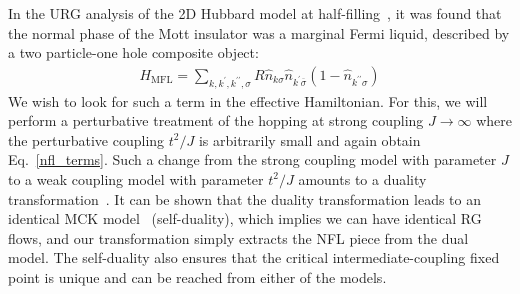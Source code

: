 \documentclass[reprint,prb,superscriptaddress]{revtex4-2}
\begin{document}
In the URG analysis of the 2D Hubbard model at half-filling~\cite{anirbanurg1}, it was found that the normal phase of the Mott insulator was a marginal Fermi liquid, described by a two particle-one hole composite object:
\begin{equation}\begin{aligned}
	\label{mfl_urg}
	H_\text{MFL} = \sum_{k,k^\prime,k^{\prime\prime},\sigma}R \hat n_{k\sigma} \hat n_{k^\prime \overline\sigma}\left(1 - \hat n_{k^{\prime\prime}\sigma}\right) 
\end{aligned}\end{equation}
We wish to look for such a term in the effective Hamiltonian. For this, we will perform a perturbative treatment of the hopping at strong coupling \(J \to \infty\) where the perturbative coupling \(t^2/J\) is arbitrarily small and again obtain Eq.~\ref{nfl_terms}. Such a change from the strong coupling model with parameter \(J\) to a weak coupling model with parameter \(t^2/J\) amounts to a duality transformation~\cite{kroha_kolf_2007,zitko_fabrizio_2017}. It can be shown that the duality transformation leads to an identical MCK model~\cite{kroha_kolf_2007} (self-duality), which implies we can have identical RG flows, and our transformation simply extracts the NFL piece from the dual model. The self-duality also ensures that the critical intermediate-coupling fixed point is unique and can be reached from either of the models.
\end{document}
